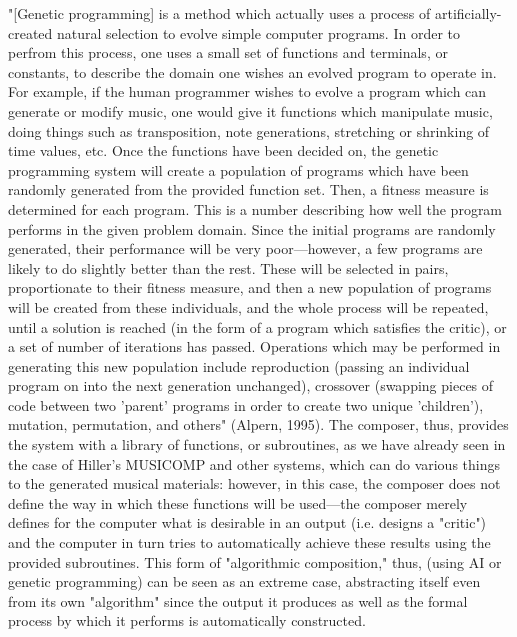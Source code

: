 \documentclass{automatextcc}
\begin{document}
"[Genetic programming] is a method which actually uses a process of artificially-created natural selection to evolve simple computer programs. In order to perfrom this process, one uses a small set of functions and terminals, or constants, to describe the domain one wishes an evolved program to operate in. For example, if the human programmer wishes to evolve a program which can generate or modify music, one would give it functions which manipulate music, doing things such as transposition, note generations, stretching or shrinking of time values, etc. Once the functions have been decided on, the genetic programming system will create a population of programs which have been randomly generated from the provided function set. Then, a fitness measure is determined for each program. This is a number describing how well the program performs in the given problem domain. Since the initial programs are randomly generated, their performance will be very poor—however, a few programs are likely to do slightly better than the rest. These will be selected in pairs, proportionate to their fitness measure, and then a new population of programs will be created from these individuals, and the whole process will be repeated, until a solution is reached (in the form of a program which satisfies the critic), or a set of number of iterations has passed. Operations which may be performed in generating this new population include reproduction (passing an individual program on into the next generation unchanged), crossover (swapping pieces of code between two 'parent' programs in order to create two unique 'children'), mutation, permutation, and others" (Alpern, 1995).
The composer, thus, provides the system with a library of functions, or subroutines, as we have already seen in the case of Hiller's MUSICOMP and other systems, which can do various things to the generated musical materials: however, in this case, the composer does not define the way in which these functions will be used—the composer merely defines for the computer what is desirable in an output (i.e. designs a "critic") and the computer in turn tries to automatically achieve these results using the provided subroutines. This form of "algorithmic composition," thus, (using AI or genetic programming) can be seen as an extreme case, abstracting itself even from its own "algorithm" since the output it produces as well as the formal process by which it performs is automatically constructed.
\end{document}
